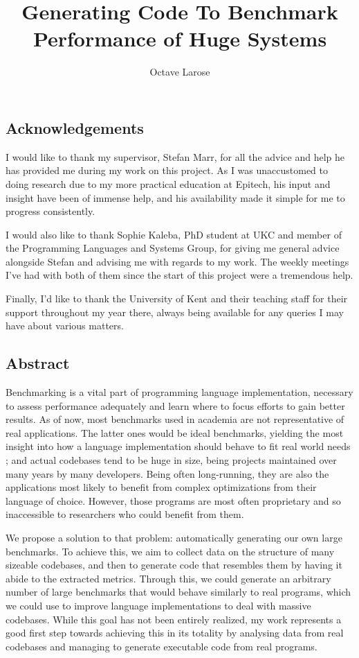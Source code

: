 \documentclass[12pt]{article}
\title{Generating Code To Benchmark Performance of Huge Systems}
\author{Octave Larose}
\begin{document}


\newpage
\subsection*{Acknowledgements}
I would like to thank my supervisor, Stefan Marr, for all the advice and help he has provided me during my work on this project. As I was unaccustomed to doing research due to my more practical education at Epitech, his input and insight have been of immense help, and his availability made it simple for me to progress consistently.

I would also like to thank Sophie Kaleba, PhD student at UKC and member of the Programming Languages and Systems Group, for giving me general advice alongside Stefan and advising me with regards to my work. The weekly meetings I've had with both of them since the start of this project were a tremendous help.

Finally, I'd like to thank the University of Kent and their teaching staff for their support throughout my year there, always being available for any queries I may have about various matters. 

\newpage
\subsection*{Abstract}
Benchmarking is a vital part of programming language implementation, necessary to assess performance adequately and learn where to focus efforts to gain better results. As of now, most benchmarks used in academia are not representative of real applications. The latter ones would be ideal benchmarks, yielding the most insight into how a language implementation should behave to fit real world needs ; and actual codebases tend to be huge in size, being projects maintained over many years by many developers. Being often long-running, they are also the applications most likely to benefit from complex optimizations from their language of choice. However, those programs are most often proprietary and so inaccessible to researchers who could benefit from them.

We propose a solution to that problem: automatically generating our own large benchmarks. To achieve this, we aim to collect data on the structure of many sizeable codebases, and then to generate code that resembles them by having it abide to the extracted metrics. Through this, we could generate an arbitrary number of large benchmarks that would behave similarly to real programs, which we could use to improve language implementations to deal with massive codebases. While this goal has not been entirely realized, my work represents a good first step towards achieving this in its totality by analysing data from real codebases and managing to generate executable code from real programs.
\end{document}
